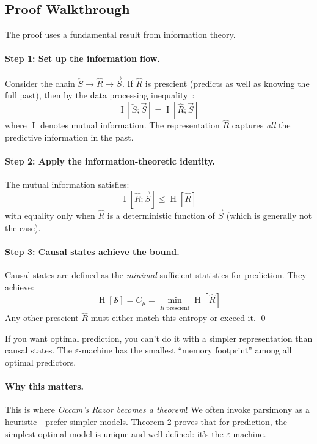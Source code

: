 \documentclass[11pt,a4paper]{article}
\theoremstyle{definition}
\theoremstyle{plain}
\newcommand{\eps}{\varepsilon}
\newcommand{\Cmu}{C_\mu}
\newcommand{\calS}{\mathcal{S}}
\newcommand{\Past}{\overleftarrow{S}}
\newcommand{\Future}{\overrightarrow{S}}
\DeclareMathOperator{\Ent}{H}
\DeclareMathOperator{\MI}{I}
\begin{document}
\subsection{Proof Walkthrough}

The proof uses a fundamental result from information theory.

\paragraph{Step 1: Set up the information flow.}
Consider the chain $\Past \to \hat{R} \to \Future$. If $\hat{R}$ is prescient (predicts as well as knowing the full past), then by the data processing inequality~\cite{cover2006elements}:
\begin{equation}
    \MI[\Past; \Future] = \MI[\hat{R}; \Future]
\end{equation}
where $\MI$ denotes mutual information. The representation $\hat{R}$ captures \emph{all} the predictive information in the past.

\paragraph{Step 2: Apply the information-theoretic identity.}
The mutual information satisfies:
\begin{equation}
    \MI[\hat{R}; \Future] \leq \Ent[\hat{R}]
\end{equation}
with equality only when $\hat{R}$ is a deterministic function of $\Future$ (which is generally not the case).

\paragraph{Step 3: Causal states achieve the bound.}
Causal states are defined as the \emph{minimal} sufficient statistics for prediction. They achieve:
\begin{equation}
    \Ent[\calS] = \Cmu = \min_{\hat{R} \text{ prescient}} \Ent[\hat{R}]
\end{equation}
Any other prescient $\hat{R}$ must either match this entropy or exceed it. \qed

\begin{intuition}
If you want optimal prediction, you can't do it with a simpler representation than causal states. The $\eps$-machine has the smallest ``memory footprint'' among all optimal predictors.
\end{intuition}

\paragraph{Why this matters.} This is where \emph{Occam's Razor becomes a theorem}! We often invoke parsimony as a heuristic---prefer simpler models. Theorem 2 proves that for prediction, the simplest optimal model is unique and well-defined: it's the $\eps$-machine.
\end{document}
